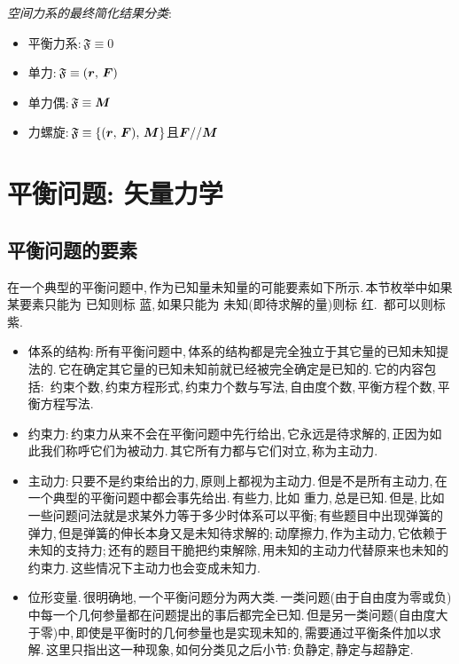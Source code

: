 \vspace{0.5cm}

\emph{空间力系的最终简化结果分类}:
\begin{itemize}
  \item 平衡力系:\,$\mathfrak{F}\equiv\mathfrak{0}$
  \item 单力:\,$\mathfrak{F}\equiv(\boldsymbol{r},\,\boldsymbol{F})$
  \item 单力偶:\,$\mathfrak{F}\equiv\boldsymbol{M}$
  \item 力螺旋:\,$\mathfrak{F}\equiv\{(\boldsymbol{r},\,\boldsymbol{F}),\,\boldsymbol{M}\}$且$\boldsymbol{F}//\boldsymbol{M}$
\end{itemize}



\section{平衡问题:  矢量力学}

\subsection{平衡问题的要素}

在一个典型的平衡问题中,\,作为已知量未知量的可能要素如下所示.\,本节枚举中如果某要素只能为{\color{blue} 已知}则标{\color{blue} 蓝},\,如果只能为{\color{red} 未知}(即待求解的量)则标{\color{red} 红}.\,{\color{purple} 都可以}则标{\color{purple} 紫}.

\begin{itemize}
  \item {\color{blue} 体系的结构}:\,所有平衡问题中,\,体系的结构都是完全独立于其它量的已知未知提法的.\,它在确定其它量的已知未知前就已经被完全确定是已知的.\,它的内容包括:\,{\color{blue} 约束个数,\,约束方程形式,\,约束力个数与写法,\,自由度个数,\,平衡方程个数,\,平衡方程写法}.
  \item {\color{red} 约束力}:\,约束力从来不会在平衡问题中先行给出,\,它永远是待求解的,\,正因为如此我们称呼它们为被动力.\,其它所有力都与它们对立,\,称为主动力.
  \item {\color{purple} 主动力}:\,只要不是约束给出的力,\,原则上都视为主动力.\,但是不是所有主动力,\,在一个典型的平衡问题中都会事先给出.\,有些力,\,比如{\color{blue} 重力},\,总是已知.\,但是,\,比如一些问题问法就是求某外力等于多少时体系可以平衡;\,有些题目中出现弹簧的弹力,\,但是弹簧的伸长本身又是未知待求解的;\,动摩擦力,\,作为主动力,\,它依赖于未知的支持力;\,还有的题目干脆把约束解除,\,用未知的主动力代替原来也未知的约束力.\,这些情况下主动力也会变成未知力.
  \item {\color{purple} 位形变量}.\,很明确地,\,一个平衡问题分为两大类.\,一类问题(由于自由度为零或负)中每一个几何参量都在问题提出的事后都完全已知.\,但是另一类问题(自由度大于零)中,\,即使是平衡时的几何参量也是实现未知的,\,需要通过平衡条件加以求解.\,这里只指出这一种现象,\,如何分类见之后小节:\,负静定,\,静定与超静定.
\end{itemize}

